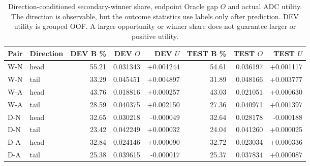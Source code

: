 \begin{table}[htbp]
\centering\footnotesize\setlength{\tabcolsep}{3pt}
\caption{Direction-conditioned secondary-winner share, endpoint Oracle gap $O$ and actual ADC utility. The direction is observable, but the outcome statistics use labels only after prediction. DEV utility is grouped OOF. A larger opportunity or winner share does not guarantee larger or positive utility.}
\label{tab:complement-directions}
\begin{tabular}{llrrrrrr}
\toprule
Pair & Direction & DEV B \% & DEV $O$ & DEV $U$ & TEST B \% & TEST $O$ & TEST $U$\\
\midrule
W-N & head & 55.21 & 0.031343 & +0.001244 & 54.61 & 0.036197 & +0.001117\\[2pt]
W-N & tail & 33.29 & 0.045451 & +0.004897 & 31.89 & 0.048166 & +0.003777\\[2pt]
W-A & head & 43.76 & 0.018816 & +0.000257 & 43.03 & 0.021051 & +0.000630\\[2pt]
W-A & tail & 28.59 & 0.040375 & +0.002150 & 27.36 & 0.040971 & +0.001397\\[2pt]
D-N & head & 32.65 & 0.030218 & -0.000049 & 32.64 & 0.028178 & -0.000188\\[2pt]
D-N & tail & 23.42 & 0.042249 & +0.000032 & 24.04 & 0.041260 & +0.000025\\[2pt]
D-A & head & 32.84 & 0.024146 & +0.000090 & 32.72 & 0.023034 & +0.000336\\[2pt]
D-A & tail & 25.38 & 0.039615 & -0.000017 & 25.37 & 0.037834 & +0.000087\\[2pt]
\bottomrule
\end{tabular}
\end{table}
